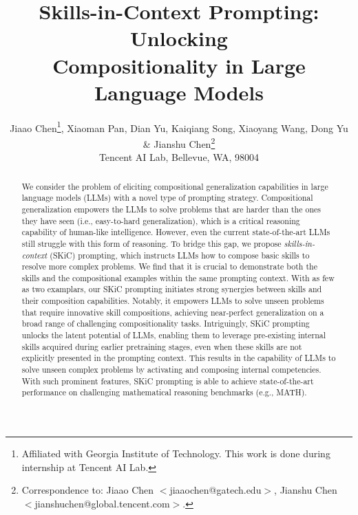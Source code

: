 \documentclass{article} %
\date{}
\title{Skills-in-Context Prompting:  Unlocking \\ Compositionality in Large Language Models}
\author{Jiaao Chen\thanks{Affiliated with Georgia Institute of Technology. This work is done during internship at Tencent AI Lab.}, \; Xiaoman Pan, Dian Yu, Kaiqiang Song, Xiaoyang Wang, Dong Yu \& Jianshu Chen\thanks{Correspondence to: Jiaao Chen $<$jiaaochen@gatech.edu$>$, Jianshu Chen $<$jianshuchen@global.tencent.com$>$.} \\
Tencent AI Lab, Bellevue, WA, 98004
}
\begin{document}
\maketitle


\begin{abstract}
We consider the problem of eliciting compositional generalization capabilities in large language models (LLMs) with a novel type of prompting strategy. Compositional generalization empowers the LLMs to solve problems that are harder than the ones they have seen (i.e., easy-to-hard generalization), which is a critical reasoning capability of human-like intelligence. However, even the current state-of-the-art LLMs still struggle with this form of reasoning. To bridge this gap, we propose \emph{skills-in-context} (SKiC) prompting, which instructs LLMs how to compose basic skills to resolve more complex problems. We find that it is crucial to demonstrate both the skills and the compositional examples within the same prompting context. With as few as two examplars, our SKiC prompting initiates strong synergies between skills and their composition capabilities. Notably, it empowers LLMs to solve unseen problems that require innovative skill compositions, achieving near-perfect generalization on a broad range of challenging compositionality tasks. Intriguingly, SKiC prompting unlocks the latent potential of LLMs, enabling them to leverage pre-existing internal skills acquired during earlier pretraining stages, even when these skills are not explicitly presented in the prompting context. This results in the capability of LLMs to solve unseen complex problems by activating and composing internal competencies. With such prominent features, SKiC prompting is able to achieve state-of-the-art performance on challenging mathematical reasoning benchmarks (e.g., MATH).
\end{abstract}




















\newpage
\appendix
\end{document}
